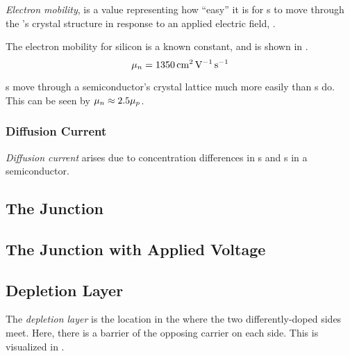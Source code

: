 \begin{definition}\label{def:Electron_Mobility}
  \emph{Electron mobility}, \ElectronMobility{} is a value representing how ``easy'' it is for s to move through the 's crystal structure in response to an applied electric field, \EField{}.

  The electron mobility for  silicon is a known constant, and is shown in .
  \begin{equation}\label{eq:Electron_Mobility-Intrinsic_Silicon}
    \mu_{n} = \SI{1350}{\centi\meter\squared\per\volt\per\second}
  \end{equation}

  \begin{remark}
    s move through a semiconductor's crystal lattice much more easily than s do.
    This can be seen by $\mu_{n} \approx 2.5 \mu_{p}$.
  \end{remark}
\end{definition}

\subsubsection{Diffusion Current}\label{subsubsec:Diffusion_Current}
\begin{definition}\label{def:Diffusion_Current}
  \emph{Diffusion current} arises due to concentration differences in s and s in a semiconductor.
\end{definition}

\subsection{The \PNJunction{} Junction}\label{subsec:The_pn_Junction}

\subsection{The \PNJunction{} Junction with Applied Voltage}\label{subsec:The_pn_Junction-Voltage_Applied}

\subsection{Depletion Layer}\label{subsec:Depletion_Layer}
\begin{definition}\label{def:Depletion_Layer}
  The \emph{depletion layer} is the location in the \PNJunction{} where the two differently-doped sides meet.
  Here, there is a barrier of the opposing carrier on each side.
  This is visualized in .
\end{definition}

